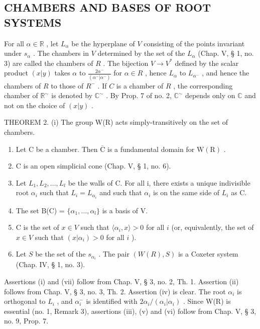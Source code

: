 \subsection{CHAMBERS AND BASES OF ROOT SYSTEMS}

For all \(\alpha \in \mathbb{R}\) , let \(L_{\alpha}\) be the hyperplane of \(V\) consisting of the points invariant under \(s_{\alpha}\) . The chambers in \(V\) determined by the set of the \(L_{\alpha}\) (Chap. V, § 1, no. 3) are called the chambers of \(R\) . The bijection \(V \to V^{*}\) defined by the scalar product \((x|y)\) takes \(\alpha\) to \(\frac{2\alpha^{-}}{(\alpha^{-}|\alpha^{-})}\) for \(\alpha \in R\) , hence \(L_{\alpha}\) to \(L_{\alpha^{-}}\) , and hence the chambers of \(R\) to those of \(R^{-}\) . If \(C\) is a chamber of \(R\) , the corresponding chamber of \(\mathbb{R}^{\sim}\) is denoted by \(\mathbb{C}^{\sim}\) . By Prop. 7 of no. 2, \(\mathbb{C}^{\sim}\) depends only on \(\mathbb{C}\) and not on the choice of \((x|y)\) .

THEOREM 2. (i) The group W(R) acts simply-transitively on the set of chambers.

\begin{enumerate}
\def\labelenumi{(\roman{enumi})}
\setcounter{enumi}{1}
\item
  Let \(\mathrm{C}\) be a chamber. Then \(\overline{\mathrm{C}}\) is a fundamental domain for \(\mathrm{W}(\mathrm{R})\) .
\item
  C is an open simplicial cone (Chap. V, § 1, no. 6).
\item
  Let \(L_{1}, L_{2}, \ldots, L_{l}\) be the walls of C. For all i, there exists a unique indivisible root \(\alpha_{i}\) such that \(L_{i} = L_{\alpha_{i}}\) and such that \(\alpha_{i}\) is on the same side of \(L_{i}\) as C.
\item
  The set B(C) = \(\{\alpha_{1},\ldots,\alpha_{l}\}\) is a basis of V.
\item
  C is the set of \(x \in V\) such that \(\langle \alpha_i, x \rangle > 0\) for all \(i\) (or, equivalently, the set of \(x \in V\) such that \((x|\alpha_i) > 0\) for all \(i\) ).
\item
  Let \(S\) be the set of the \(s_{\alpha_i}\) . The pair \((W(R), S)\) is a Coxeter system (Chap. IV, § 1, no. 3).
\end{enumerate}

Assertions (i) and (vii) follow from Chap. V, § 3, no. 2, Th. 1. Assertion (ii) follows from Chap. V, § 3, no. 3, Th. 2. Assertion (iv) is clear. The root \(\alpha_{i}\) is orthogonal to \(L_{i}\) , and \(\alpha_{i}^{-}\) is identified with \(2\alpha_{i}/(\alpha_{i}|\alpha_{i})\) . Since W(R) is essential (no. 1, Remark 3), assertions (iii), (v) and (vi) follow from Chap. V, § 3, no. 9, Prop. 7.

